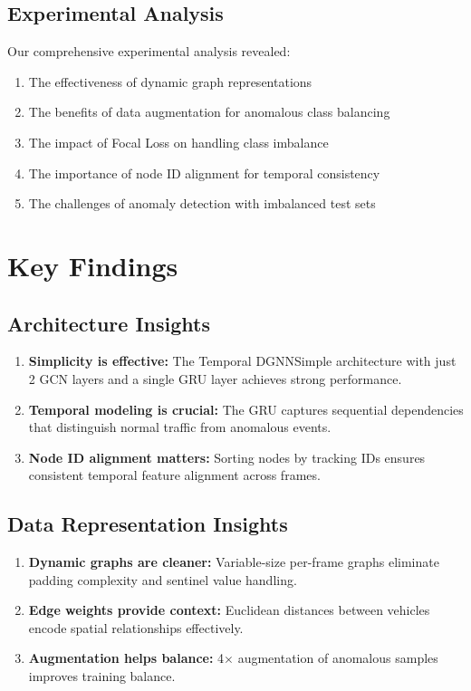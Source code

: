 \subsection{Experimental Analysis}

Our comprehensive experimental analysis revealed:
\begin{enumerate}
    \item The effectiveness of dynamic graph representations
    \item The benefits of data augmentation for anomalous class balancing
    \item The impact of Focal Loss on handling class imbalance
    \item The importance of node ID alignment for temporal consistency
    \item The challenges of anomaly detection with imbalanced test sets
\end{enumerate}

\section{Key Findings}

\subsection{Architecture Insights}

\begin{enumerate}
    \item \textbf{Simplicity is effective:} The Temporal DGNNSimple architecture with just 2 GCN layers and a single GRU layer achieves strong performance.
    
    \item \textbf{Temporal modeling is crucial:} The GRU captures sequential dependencies that distinguish normal traffic from anomalous events.
    
    \item \textbf{Node ID alignment matters:} Sorting nodes by tracking IDs ensures consistent temporal feature alignment across frames.
\end{enumerate}

\subsection{Data Representation Insights}

\begin{enumerate}
    \item \textbf{Dynamic graphs are cleaner:} Variable-size per-frame graphs eliminate padding complexity and sentinel value handling.
    
    \item \textbf{Edge weights provide context:} Euclidean distances between vehicles encode spatial relationships effectively.
    
    \item \textbf{Augmentation helps balance:} 4$\times$ augmentation of anomalous samples improves training balance.
\end{enumerate}

